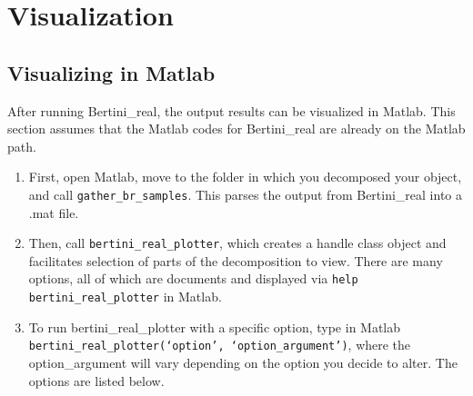 
\section{Visualization}
\label{sec:visualization}






\subsection{Visualizing in Matlab}
After running Bertini\_real, the output results can be visualized in Matlab.  This section assumes that the Matlab codes for Bertini\_real are already on the Matlab path.

\begin{enumerate}
\item First, open Matlab, move to the folder in which you decomposed your object, and call \texttt{gather\_br\_samples}. This parses the output from Bertini\_real into a .mat file.
\item Then, call \texttt{bertini\_real\_plotter\-}, which creates a handle class object and facilitates selection of parts of the decomposition to view. There are many options, all of which are documents and displayed via \texttt{help bertini\_real\_plotter\-} in Matlab.
\item To run bertini\_real\_plotter with a specific option, type in Matlab\\ 
	\texttt{bertini\_real\_plotter\-(`option', `option\_argument')}, where the option\_argument will vary depending on the option you decide to alter. The options are listed below.
\end{enumerate}


